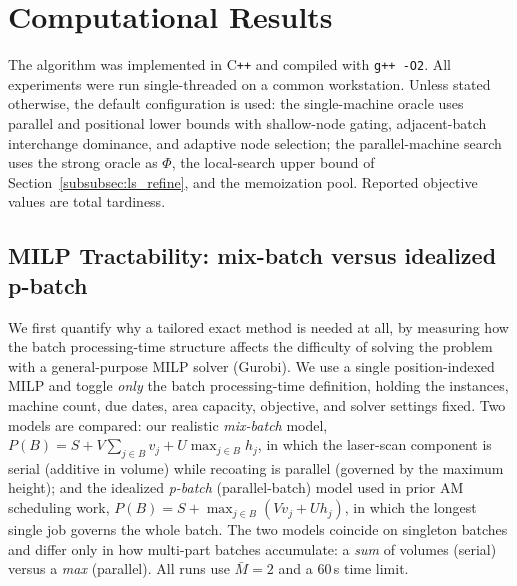 \documentclass[letterpaper, 10 pt, conference]{ieeeconf}  %
\begin{document}
\section{Computational Results}
\label{sec:results}

The algorithm was implemented in C\texttt{++} and compiled with \texttt{g++ -O2}.
All experiments were run single-threaded on a common workstation. Unless stated
otherwise, the default configuration is used: the single-machine oracle uses
parallel and positional lower bounds with shallow-node gating, adjacent-batch
interchange dominance, and adaptive node selection; the parallel-machine search
uses the strong oracle as $\Phi$, the local-search upper bound of
Section~\ref{subsubsec:ls_refine}, and the memoization pool. Reported objective
values are total tardiness.

\subsection{MILP Tractability: mix-batch versus idealized p-batch}
\label{subsec:res_milp}

We first quantify why a tailored exact method is needed at all, by measuring how
the batch processing-time structure affects the difficulty of solving the problem
with a general-purpose MILP solver (Gurobi). We use a single position-indexed
MILP and toggle \emph{only} the batch processing-time definition, holding the
instances, machine count, due dates, area capacity, objective, and solver
settings fixed. Two models are compared: our realistic \emph{mix-batch} model,
$P(B)=S+V\sum_{j\in B}v_j+U\max_{j\in B}h_j$, in which the laser-scan component is
serial (additive in volume) while recoating is parallel (governed by the maximum
height); and the idealized \emph{p-batch} (parallel-batch) model used in prior AM
scheduling work, $P(B)=S+\max_{j\in B}(V v_j+U h_j)$, in which the longest single
job governs the whole batch.
The two models coincide on singleton batches and differ only in how multi-part
batches accumulate: a \emph{sum} of volumes (serial) versus a \emph{max}
(parallel). All runs use $\bar M=2$ and a $60$\,s time limit.
\end{document}
